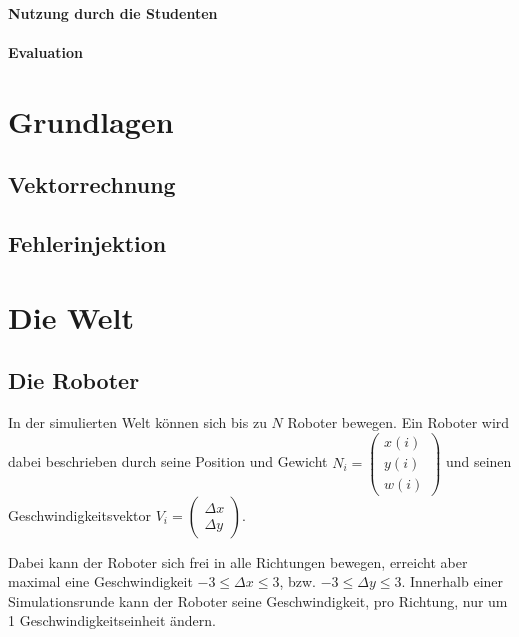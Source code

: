 \documentclass[
    12pt,
    bibliography=totoc,
    ngerman
]{scrartcl}
\begin{document}

\paragraph{Nutzung durch die Studenten} 

\paragraph{Evaluation}

\clearpage
\section{Grundlagen}

\subsection{Vektorrechnung}

\subsection{Fehlerinjektion}

\clearpage
\section{Die Welt}

\subsection{Die Roboter}
In der simulierten Welt k{\"{o}}nnen sich bis zu $N$ Roboter bewegen.
Ein Roboter wird dabei beschrieben durch seine Position und Gewicht
$ N_i = \left(\begin{smallmatrix} x(i) \\ y(i) \\ w(i) \end{smallmatrix}\right)$ und
seinen Geschwindigkeitsvektor
$ V_i = \left(\begin{smallmatrix} \Delta x \\ \Delta y \end{smallmatrix}\right)$.

Dabei kann der Roboter sich frei in alle Richtungen bewegen, erreicht aber
maximal eine Geschwindigkeit $ -3 \leq \Delta x \leq 3$, bzw. 
$ -3 \leq \Delta y \leq 3$.
Innerhalb einer Simulationsrunde kann der Roboter seine Geschwindigkeit, pro
Richtung, nur um 1 Geschwindigkeitseinheit {\"{a}}ndern.
\end{document}
